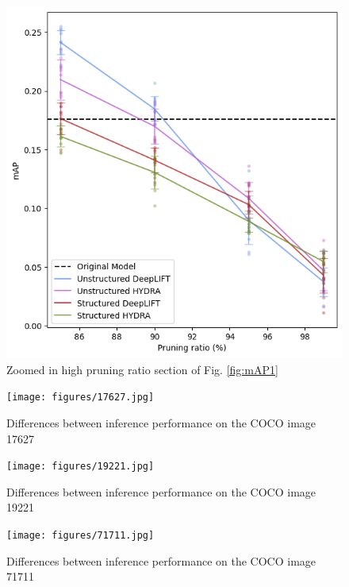 \documentclass[journal,onecolumn,12pt]{IEEEtran}
\begin{document}
\begin{figure}[H]
    \centering
    \captionsetup{justification=centering}
    \includegraphics[width=0.5\linewidth]{figures/mAP1zoom.png}
    \caption{Zoomed in high pruning ratio section of Fig. \ref{fig:mAP1}}
    \label{fig:mAP1zoom}
\end{figure}

\begin{figure}
    \centering
    \captionsetup{justification=centering}
    \texttt{[image: figures/17627.jpg]}
    \caption*{}
    \caption{Differences between inference performance on the COCO image 17627}
    \label{fig:sample2}
\end{figure}

\begin{figure}
    \centering
    \captionsetup{justification=centering}
    \texttt{[image: figures/19221.jpg]}
    \caption*{}
    \caption{Differences between inference performance on the COCO image 19221}
    \label{fig:sample3}
\end{figure}

\begin{figure}
    \centering
    \captionsetup{justification=centering}
    \texttt{[image: figures/71711.jpg]}
    \caption*{}
    \caption{Differences between inference performance on the COCO image 71711}
    \label{fig:sample4}
\end{figure}
\end{document}
